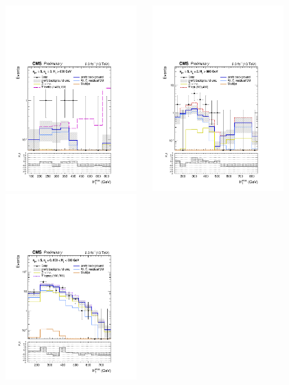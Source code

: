 \clearpage
\begin{figure}[tbhp]
  \begin{center}
    \includegraphics[width=0.45\textwidth]{figures/mht_shapes/v0/postFitShape_ge3b_ge5j_800_Inf_prefit_T1bbbb_1400_100} ~~
    \includegraphics[width=0.45\textwidth]{figures/mht_shapes/v0/postFitShape_eq2b_ge5j_800_Inf_prefit_T1tttt_800_400} \\
    \includegraphics[width=0.45\textwidth]{figures/mht_shapes/v0/postFitShape_eq0b_ge5j_600_800_prefit_T1qqqq_900_700}

\end{center}
\end{figure}
